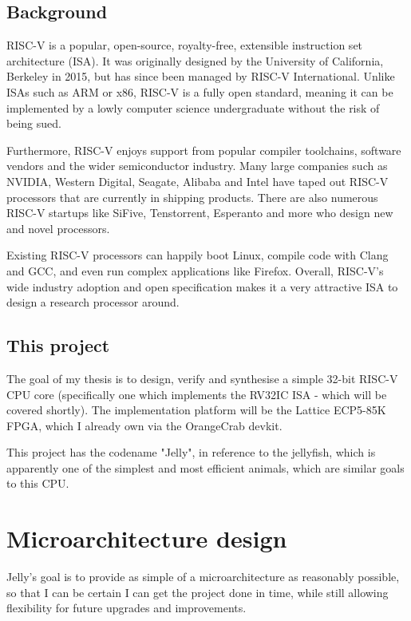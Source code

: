 \documentclass{article}
\begin{document}


\subsection{Background}
RISC-V is a popular, open-source, royalty-free, extensible instruction set architecture (ISA). It was
originally designed by the University of California, Berkeley in 2015, but has since been managed by RISC-V
International. Unlike ISAs such as ARM or x86, RISC-V is a fully open standard, meaning it can be implemented
by a lowly computer science undergraduate without the risk of being sued.

Furthermore, RISC-V enjoys support from popular compiler toolchains, software vendors and the wider
semiconductor industry. Many large companies such as NVIDIA, Western Digital, Seagate, Alibaba and Intel have
taped out RISC-V processors that are currently in shipping products. There are also numerous RISC-V startups
like SiFive, Tenstorrent, Esperanto and more who design new and novel processors.

Existing RISC-V processors can happily boot Linux, compile code with Clang and GCC, and even run complex
applications like Firefox. Overall, RISC-V's wide industry adoption and open specification makes it a very
attractive ISA to design a research processor around.

\subsection{This project}
The goal of my thesis is to design, verify and synthesise a simple 32-bit RISC-V CPU core (specifically one
which implements the RV32IC ISA - which will be covered shortly). The implementation platform will be the
Lattice ECP5-85K FPGA, which I already own via the OrangeCrab devkit.

This project has the codename "Jelly", in
reference to the jellyfish, which is apparently one of the simplest and most efficient animals, which are
similar goals to this CPU.

\section{Microarchitecture design}
Jelly's goal is to provide as simple of a microarchitecture as reasonably possible, so that I can be certain
I can get the project done in time, while still allowing flexibility for future upgrades and
improvements.
\end{document}
